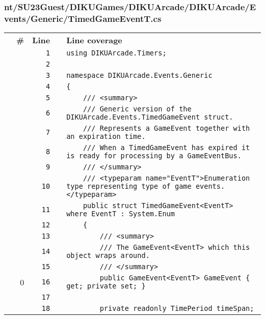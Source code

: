 \documentclass[a4paper,landscape,10pt]{article}
\begin{document}
\subsubsection{nt/SU23Guest/DIKUGames/DIKUArcade/DIKUArcade/Events/Generic/TimedGameEventT.cs}
\begin{longtable}[l]{lrrll}
\textbf{} & \textbf{\#} & \textbf{Line} & \textbf{} & \textbf{Line coverage}\\
\cellcolor{gray} &  & \verb~1~ & & \verb~using DIKUArcade.Timers;~\\
\cellcolor{gray} &  & \verb~2~ & & \verb~~\\
\cellcolor{gray} &  & \verb~3~ & & \verb~namespace DIKUArcade.Events.Generic~\\
\cellcolor{gray} &  & \verb~4~ & & \verb~{~\\
\cellcolor{gray} &  & \verb~5~ & & \verb~    /// <summary>~\\
\cellcolor{gray} &  & \verb~6~ & & \verb~    /// Generic version of the DIKUArcade.Events.TimedGameEvent struct.~\\
\cellcolor{gray} &  & \verb~7~ & & \verb~    /// Represents a GameEvent together with an expiration time.~\\
\cellcolor{gray} &  & \verb~8~ & & \verb~    /// When a TimedGameEvent has expired it is ready for processing by a GameEventBus.~\\
\cellcolor{gray} &  & \verb~9~ & & \verb~    /// </summary>~\\
\cellcolor{gray} &  & \verb~10~ & & \verb~    /// <typeparam name="EventT">Enumeration type representing type of game events.</typeparam>~\\
\cellcolor{gray} &  & \verb~11~ & & \verb~    public struct TimedGameEvent<EventT> where EventT : System.Enum~\\
\cellcolor{gray} &  & \verb~12~ & & \verb~    {~\\
\cellcolor{gray} &  & \verb~13~ & & \verb~        /// <summary>~\\
\cellcolor{gray} &  & \verb~14~ & & \verb~        /// The GameEvent<EventT> which this object wraps around.~\\
\cellcolor{gray} &  & \verb~15~ & & \verb~        /// </summary>~\\
\cellcolor{red} & 0 & \verb~16~ & & \verb~        public GameEvent<EventT> GameEvent { get; private set; }~\\
\cellcolor{gray} &  & \verb~17~ & & \verb~~\\
\cellcolor{gray} &  & \verb~18~ & & \verb~        private readonly TimePeriod timeSpan;~\\

\end{longtable}
\end{document}
